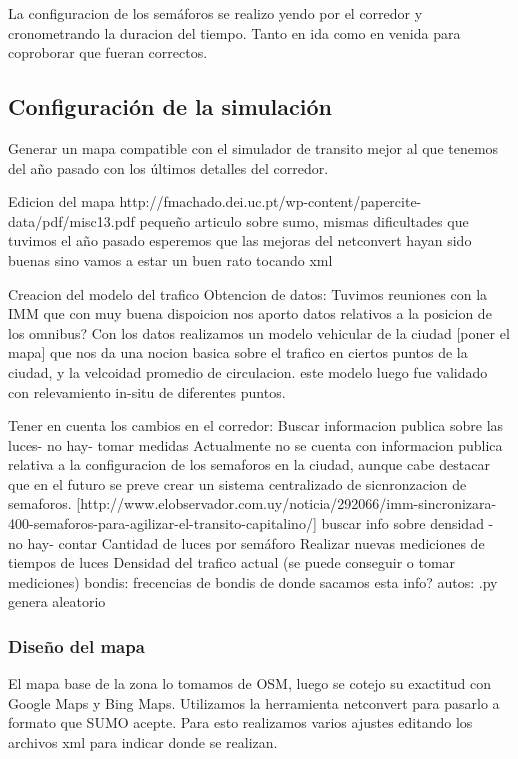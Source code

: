 La configuracion de los semáforos se realizo yendo por el corredor y cronometrando la duracion del tiempo. Tanto en ida como en venida para coproborar que fueran correctos.



\subsection{Configuración de la simulación}


Generar un mapa compatible con el simulador de transito mejor al que tenemos del año pasado con los últimos detalles del corredor.

Edicion del mapa http://fmachado.dei.uc.pt/wp-content/papercite-data/pdf/misc13.pdf pequeño articulo sobre sumo, mismas dificultades que tuvimos el año pasado esperemos que las mejoras del netconvert hayan sido buenas sino vamos a estar un buen rato tocando xml

Creacion del modelo del trafico
	Obtencion de datos: Tuvimos reuniones con la IMM que con muy buena dispoicion nos aporto datos relativos a la posicion de los omnibus?
	Con los datos realizamos un modelo vehicular de la ciudad [poner el mapa] que nos da una nocion basica sobre el trafico en ciertos puntos de la ciudad, y la velcoidad promedio de circulacion.
	este modelo luego fue validado con relevamiento in-situ de diferentes puntos.

Tener en cuenta los cambios en el corredor:
	Buscar informacion publica sobre las luces- no hay- tomar medidas 
	Actualmente no se cuenta con informacion publica relativa a la configuracion de los semaforos en la ciudad, aunque cabe destacar que en el futuro se preve crear un sistema centralizado de sicnronzacion de semaforos.  [http://www.elobservador.com.uy/noticia/292066/imm-sincronizara-400-semaforos-para-agilizar-el-transito-capitalino/] 
	buscar info sobre densidad - no hay- contar
	Cantidad de luces por semáforo
	Realizar nuevas mediciones de tiempos de luces
	Densidad del trafico actual (se puede conseguir o tomar mediciones)
	bondis: frecencias de bondis
	de donde sacamos esta info?
	autos: .py genera aleatorio


\subsubsection{Diseño del mapa}
El mapa base de la zona lo tomamos de OSM, luego se cotejo su exactitud con Google Maps y Bing Maps.
Utilizamos la herramienta netconvert para pasarlo a formato que SUMO acepte. 
Para esto realizamos varios ajustes editando los archivos xml para indicar donde se realizan.

